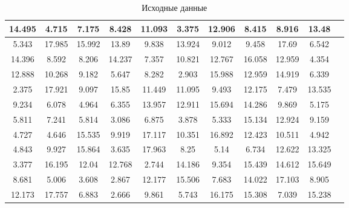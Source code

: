 \documentclass[a4paper, 14pt]{extarticle}
\begin{document}
\begin{center}
    \begin{table}[h!]
        \begin{adjustbox}{max width=\textwidth}
            \begin{tabular}{|c|c|c|c|c|c|c|c|c|c|c|}
                \hline
                14.495 & 4.715 & 7.175 & 8.428 & 11.093 &
                3.375 & 12.906 & 8.415 & 8.916 & 13.48 \\
                \hline
                5.343 & 17.985 & 15.992 & 13.89 & 9.838 &
                13.924 & 9.012 & 9.458 & 17.69 & 6.542 \\
                \hline
                14.396 & 8.592 & 8.206 & 14.237 & 7.357 &
                10.821 & 12.767 & 16.058 & 12.959 & 4.354 \\
                \hline
                12.888 & 10.268 & 9.182 & 5.647 & 8.282 &
                2.903 & 15.988 & 12.959 & 14.919 & 6.339 \\
                \hline
                2.375 & 17.921 & 9.097 & 15.85 & 11.449 &
                11.095 & 9.493 & 12.175 & 7.479 & 13.535 \\
                \hline
                9.234 & 6.078 & 4.964 & 6.355 & 13.957 &
                12.911 & 15.694 & 14.286 & 9.869 & 5.175 \\
                \hline
                5.811 & 7.241 & 5.814 & 3.086 & 6.875 &
                3.878 & 5.333 & 15.134 & 12.924 & 9.159 \\
                \hline
                4.727 & 4.646 & 15.535 & 9.919 & 17.117 &
                10.351 & 16.892 & 12.423 & 10.511 & 4.942 \\
                \hline
                4.843 & 9.927 & 15.864 & 3.635 & 17.963 &
                8.25 & 5.14 & 6.734 & 12.622 & 13.325 \\
                \hline
                3.377 & 16.195 & 12.04 & 12.768 & 2.744 &
                14.186 & 9.354 & 15.439 & 14.612 & 15.649 \\
                \hline
                8.681 & 5.006 & 3.608 & 2.867 & 12.177 &
                15.506 & 7.683 & 14.022 & 17.103 & 8.905 \\
                \hline
                12.173 & 17.757 & 6.883 & 2.666 & 9.861 &
                5.743 & 16.175 & 15.308 & 7.039 & 15.238 \\
                \hline
            \end{tabular}
        \end{adjustbox}
        \caption{Исходные данные}
        \label{tab:data}
    \end{table}
\end{center}
\end{document}
